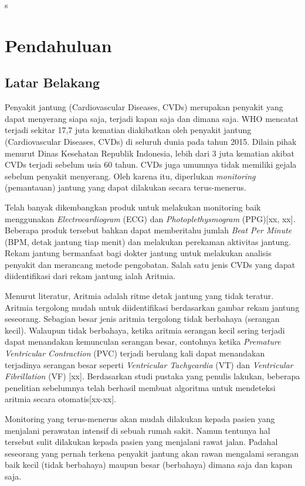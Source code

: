 s\chapter{Pendahuluan}
\section{Latar Belakang}
Penyakit jantung (Cardiovascular Diseases, CVDs) merupakan penyakit yang dapat menyerang siapa saja, terjadi kapan saja dan dimana saja. WHO mencatat terjadi sekitar 17,7 juta kematian diakibatkan oleh penyakit jantung (Cardiovascular Diseases, CVDs) di seluruh dunia pada tahun 2015\cite{who2015facts}. Dilain pihak menurut Dinas Kesehatan Republik Indonesia, lebih dari 3 juta kematian akibat CVDs terjadi sebelum usia 60 tahun\cite{depkes2014}. CVDs juga umumnya tidak memiliki gejala sebelum penyakit menyerang\cite{who2015facts}. Oleh karena itu, diperlukan \textit{monitoring} (pemantauan) jantung yang dapat dilakukan secara terus-menerus.

Telah banyak dikembangkan produk untuk melakukan monitoring baik menggunakan \textit{Electrocardiogram} (ECG) dan \textit{Photoplethysmogram} (PPG)[xx, xx]. Beberapa produk tersebut bahkan dapat memberitahu jumlah \textit{Beat Per Minute} (BPM, detak jantung tiap menit) dan melakukan perekaman aktivitas jantung. Rekam jantung bermanfaat bagi dokter jantung untuk melakukan analisis penyakit dan merancang metode pengobatan. Salah satu jenis CVDs yang dapat diidentifikasi dari rekam jantung ialah Aritmia.

Menurut literatur, Aritmia adalah ritme detak jantung yang tidak teratur\cite{cvd_is}. Aritmia tergolong mudah untuk diidentifikasi berdasarkan gambar rekam jantung seseorang. Sebagian besar jenis aritmia tergolong tidak berbahaya (serangan kecil)\cite{arrhythmia_is}. Walaupun tidak berbahaya, ketika aritmia serangan kecil sering terjadi dapat menandakan kemunculan serangan besar, contohnya ketika \textit{Premature Ventricular Contraction} (PVC) terjadi berulang kali dapat menandakan terjadinya serangan besar seperti \textit{Ventricular Tachycardia} (VT) dan \textit{Ventricular Fibrillation} (VF) [xx]. Berdasarkan studi pustaka yang penulis lakukan, beberapa penelitian sebelumnya telah berhasil membuat algoritma untuk mendeteksi aritmia secara otomatis[xx-xx].

Monitoring yang terus-menerus akan mudah dilakukan kepada pasien yang menjalani perawatan intensif di sebuah rumah sakit. Namun tentunya hal tersebut sulit dilakukan kepada pasien yang menjalani rawat jalan. Padahal seseorang yang pernah terkena penyakit jantung akan rawan mengalami serangan baik kecil (tidak berbahaya) maupun besar (berbahaya) dimana saja dan kapan saja.

